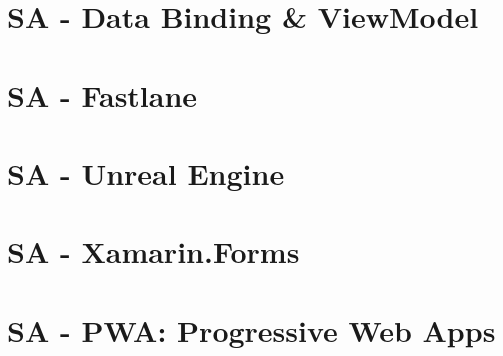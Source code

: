 \documentclass[a4paper]{article}
\begin{document}
	
	
	\section{SA - Data Binding \& ViewModel}
	
	
	
	\section{SA - Fastlane}
	
	
	
	\section{SA - Unreal Engine}
	
	
	
	\section{SA - Xamarin.Forms}
	
	
	
	\section{SA - PWA: Progressive Web Apps}
	
\end{document}
